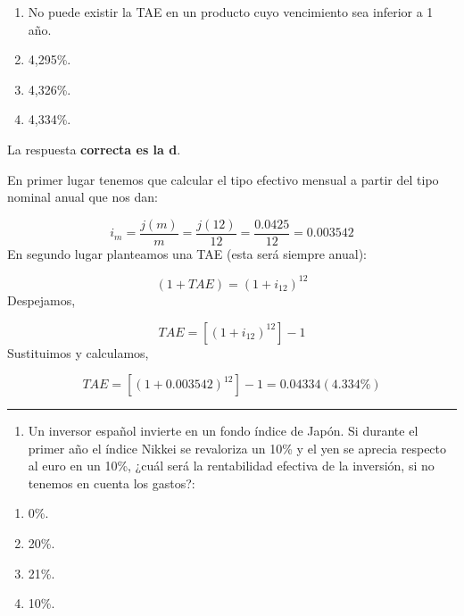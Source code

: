 \documentclass[
  letterpaper,
  DIV=11,
  numbers=noendperiod]{scrreprt}
\providecommand{\tightlist}{%
  \setlength{\itemsep}{0pt}\setlength{\parskip}{0pt}}\usepackage{longtable,booktabs,array}
\begin{document}
\begin{enumerate}
\def\labelenumi{\alph{enumi})}
\item
  No puede existir la TAE en un producto cuyo vencimiento sea inferior a
  1 año.
\item
  4,295\%.
\item
  4,326\%.
\item
  4,334\%.
\end{enumerate}

\begin{tcolorbox}[enhanced jigsaw, left=2mm, opacityback=0, colback=white, breakable, arc=.35mm, bottomrule=.15mm, rightrule=.15mm, toprule=.15mm, leftrule=.75mm, colframe=quarto-callout-tip-color-frame]
\begin{minipage}[t]{5.5mm}
\textcolor{quarto-callout-tip-color}{\faLightbulb}
\end{minipage}%
\begin{minipage}[t]{\textwidth - 5.5mm}

La respuesta \textbf{correcta es la d}.

En primer lugar tenemos que calcular el tipo efectivo mensual a partir
del tipo nominal anual que nos dan:

\[i_m=\frac{j\left(m\right)}{m}=\frac{j\left(12\right)}{12}=\frac{0.0425}{12}=0.003542\]
En segundo lugar planteamos una TAE (esta será siempre anual):

\[(1+TAE)=(1+i_{12})^{12}\] Despejamos,

\[TAE=\left[(1+i_{12})^{12}\right]-1\] Sustituimos y calculamos,

\[TAE=\left[(1+ 0.003542)^{12}\right]-1=0.04334(4.334\%)\]

\end{minipage}%
\end{tcolorbox}

\begin{center}\rule{0.5\linewidth}{0.5pt}\end{center}

\begin{enumerate}
\def\labelenumi{\arabic{enumi}.}
\setcounter{enumi}{52}
\tightlist
\item
  Un inversor español invierte en un fondo índice de Japón. Si durante
  el primer año el índice Nikkei se revaloriza un 10\% y el yen se
  aprecia respecto al euro en un 10\%, ¿cuál será la rentabilidad
  efectiva de la inversión, si no tenemos en cuenta los gastos?:
\end{enumerate}

\begin{enumerate}
\def\labelenumi{\alph{enumi})}
\item
  0\%.
\item
  20\%.
\item
  21\%.
\item
  10\%.
\end{enumerate}
\end{document}
